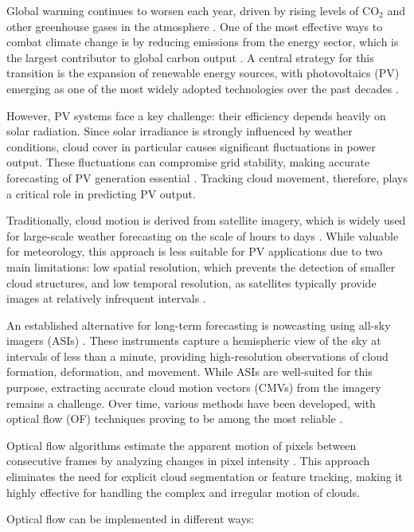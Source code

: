 Global warming continues to worsen each year, driven by rising levels of CO$_2$ and other greenhouse gases in the atmosphere \cite{ipcc2023}. One of the most effective ways to combat climate change is by reducing emissions from the energy sector, which is the largest contributor to global carbon output \cite{iea2022}. A central strategy for this transition is the expansion of renewable energy sources, with photovoltaics (PV) emerging as one of the most widely adopted technologies over the past decades \cite{fraunhofer2021}.

However, PV systems face a key challenge: their efficiency depends heavily on solar radiation. Since solar irradiance is strongly influenced by weather conditions, cloud cover in particular causes significant fluctuations in power output. These fluctuations can compromise grid stability, making accurate forecasting of PV generation essential \cite{lorenz2009}. Tracking cloud movement, therefore, plays a critical role in predicting PV output.

Traditionally, cloud motion is derived from satellite imagery, which is widely used for large-scale weather forecasting on the scale of hours to days \cite{schmetz2002}. While valuable for meteorology, this approach is less suitable for PV applications due to two main limitations: low spatial resolution, which prevents the detection of smaller cloud structures, and low temporal resolution, as satellites typically provide images at relatively infrequent intervals \cite{hammer2003,inman2013}.

An established alternative for long-term forecasting is nowcasting using all-sky imagers (ASIs) \cite{chow2011,kleissl2013}. These instruments capture a hemispheric view of the sky at intervals of less than a minute, providing high-resolution observations of cloud formation, deformation, and movement. While ASIs are well-suited for this purpose, extracting accurate cloud motion vectors (CMVs) from the imagery remains a challenge. Over time, various methods have been developed, with optical flow (OF) techniques proving to be among the most reliable \cite{urquhart2015}.

Optical flow algorithms estimate the apparent motion of pixels between consecutive frames by analyzing changes in pixel intensity \cite{horn1981determining}. This approach eliminates the need for explicit cloud segmentation or feature tracking, making it highly effective for handling the complex and irregular motion of clouds.

Optical flow can be implemented in different ways:

